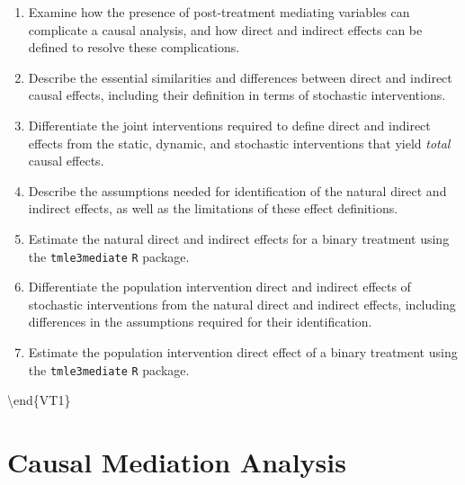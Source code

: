 \documentclass[
  12pt, krantz2,
]{krantz}
\newcommand{\passthrough}[1]{#1}
\providecommand{\tightlist}{%
  \setlength{\itemsep}{0pt}\setlength{\parskip}{0pt}}
\newcommand{\1}{\mathbbm{1}}
\theoremstyle{definition}
\theoremstyle{definition}
\theoremstyle{definition}
\theoremstyle{definition}
\theoremstyle{remark}
\begin{document}
\begin{enumerate}
\def\labelenumi{\arabic{enumi}.}
\tightlist
\item
  Examine how the presence of post-treatment mediating variables can complicate
  a causal analysis, and how direct and indirect effects can be defined to
  resolve these complications.
\item
  Describe the essential similarities and differences between direct and
  indirect causal effects, including their definition in terms of stochastic
  interventions.
\item
  Differentiate the joint interventions required to define direct and indirect
  effects from the static, dynamic, and stochastic interventions that yield
  \emph{total} causal effects.
\item
  Describe the assumptions needed for identification of the natural direct and
  indirect effects, as well as the limitations of these effect definitions.
\item
  Estimate the natural direct and indirect effects for a binary treatment using
  the \passthrough{\lstinline!tmle3mediate!} \passthrough{\lstinline!R!} package.
\item
  Differentiate the population intervention direct and indirect effects of
  stochastic interventions from the natural direct and indirect effects,
  including differences in the assumptions required for their identification.
\item
  Estimate the population intervention direct effect of a binary treatment
  using the \passthrough{\lstinline!tmle3mediate!} \passthrough{\lstinline!R!} package.
\end{enumerate}

\textbackslash end\{VT1\}

\hypertarget{causal-mediation-analysis-1}{%
\section{Causal Mediation Analysis}\label{causal-mediation-analysis-1}}
\end{document}
